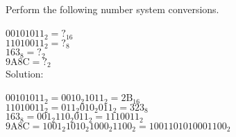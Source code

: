 Perform the following number system conversions. \\
\\
$00101011_2 = ?_{16}$ \\
$11010011_2 = ?_8$ \\
$163_8 = ?_2$ \\
$9\textrm{A}8\textrm{C} = ?_2$ \\

Solution: \\
\\
$00101011_2 = 0010_2 1011_2 = 2\textrm{B}_{16}$ \\
$11010011_2 = 011_2 010_2 011_2 = 323_8$ \\
$163_8 = 001_2 110_2 011_2 = 1110011_2$ \\
$9\textrm{A}8\textrm{C} = 1001_2 1010_2 1000_2 1100_2 = 1001101010001100_2$ \\
\\
